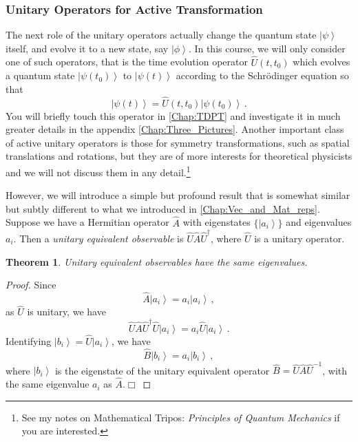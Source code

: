 \documentclass{article}
\theoremstyle{plain}\theoremheaderfont{\normalfont\itshape}\theorembodyfont{\rmfamily}\theoremseparator{.}\newtheorem*{rem}{Remark}\newtheorem*{ex}{Example}\newtheorem*{proof}{Proof}\newtheorem*{altp}{Alternative proof}
\theoremstyle{plain}\theoremheaderfont{\normalfont\bfseries}\theorembodyfont{\rmfamily}\theoremseparator{.}\newtheorem{thm}{Theorem}[section]\newtheorem{lem}[thm]{Lemma}\newtheorem{prop}[thm]{Proposition}\newtheorem*{cor}{Corollary}\newtheorem{defn}[thm]{Definition}\newtheorem{clm}[thm]{Claim}\newtheorem{clminproof}{Claim}
\theoremstyle{break}\theoremheaderfont{\normalfont\itshape}\theorembodyfont{\rmfamily}\theoremseparator{.\medskip}\newtheorem*{proofskip}{Proof}\newtheorem*{exs}{Examples}\newtheorem*{rems}{Remarks}
\theoremstyle{break}\theoremheaderfont{\normalfont\bfseries}\theorembodyfont{\rmfamily}\theoremseparator{.\medskip}\newtheorem{lemskip}[thm]{Lemma}\newtheorem{defnskip}[thm]{Definition}\newtheorem{propskip}[thm]{Proposition}\newtheorem{thmskip}[thm]{Theorem}
\numberwithin{equation}{section}
\newcommand{\qed}{\hfill\ensuremath{\Box}}
\newcommand{\ket}[1]{\left| #1 \right\rangle}
\begin{document}
    \subsubsection{Unitary Operators for Active Transformation}
    The next role of the unitary operators actually change the quantum state \(\ket{\psi}\) itself, and evolve it to a new state, say \(\ket{\phi}\). In this course, we will only consider one of such operators, that is the time evolution operator \(\hat{U}(t,t_0)\) which evolves a quantum state \(\ket{\psi(t_0)}\) to \(\ket{\psi(t)}\) according to the Schr\"{o}dinger equation so that
    \begin{equation}
        \ket{\psi(t)}=\hat{U}(t,t_0)\ket{\psi(t_0)}\,.
    \end{equation}
    You will briefly touch this operator in \cref{Chap:TDPT} and investigate it in much greater details in the appendix \cref{Chap:Three_Pictures}. Another important class of active unitary operators is those for symmetry transformations, such as spatial translations and rotations, but they are of more interests for theoretical physicists and we will not discuss them in any detail.\footnote{See my notes on Mathematical Tripos: \textit{Principles of Quantum Mechanics} if you are interested.}

    However, we will introduce a simple but profound result that is somewhat similar but subtly different to what we introduced in \cref{Chap:Vec_and_Mat_reps}. Suppose we have a Hermitian operator \(\hat{A}\) with eigenstates \(\{\ket{a_i}\}\) and eigenvalues \(a_i\). Then a \textit{unitary equivalent observable} is \(\hat{U}\hat{A}\hat{U}^\dagger\), where \(\hat{U}\) is a unitary operator.  
    \begin{thm}
        Unitary equivalent observables have the same eigenvalues.
    \end{thm}
    \begin{proof}
        Since
        \begin{equation}
            \hat{A}\ket{a_i}=a_i\ket{a_i}\,,
        \end{equation}
        as \(\hat{U}\) is unitary, we have
        \begin{equation}
            \hat{U}\hat{A}\hat{U}^\dagger\hat{U}\ket{a_i}=a_i\hat{U}\ket{a_i}\,.
        \end{equation}
        Identifying \(\ket{b_i}=\hat{U}\ket{a_i}\), we have
        \begin{equation}
            \hat{B}\ket{b_i}=a_i\ket{b_i}\,,
        \end{equation}
        where \(\ket{b_i}\) is the eigenstate of the unitary equivalent operator \(\hat{B}=\hat{U}\hat{A}\hat{U}^{-1}\), with the same eigenvalue \(a_i\) as \(\hat{A}\).\qed
    \end{proof}
    
\end{document}
